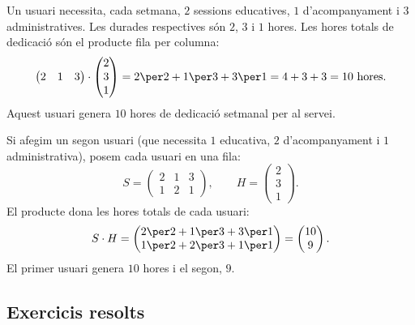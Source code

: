 \begin{exemple}
Un usuari necessita, cada setmana, $2$ sessions educatives, $1$ d'acompanyament i
$3$ administratives. Les durades respectives són $2$, $3$ i $1$ hores. Les hores
totals de dedicació són el producte fila per columna:
\[
\begin{pmatrix} 2 & 1 & 3 \end{pmatrix}\cdot\begin{pmatrix} 2 \\ 3 \\ 1 \end{pmatrix}
= 2\per 2 + 1\per 3 + 3\per 1 = 4 + 3 + 3 = 10 \text{ hores}.
\]
Aquest usuari genera $10$ hores de dedicació setmanal per al servei.
\end{exemple}

\begin{exemple}
Si afegim un segon usuari (que necessita $1$ educativa, $2$ d'acompanyament i $1$
administrativa), posem cada usuari en una fila:
\[
S=\begin{pmatrix} 2 & 1 & 3 \\ 1 & 2 & 1 \end{pmatrix},\qquad
H=\begin{pmatrix} 2 \\ 3 \\ 1 \end{pmatrix}.
\]
El producte dona les hores totals de cada usuari:
\[
S\cdot H=\begin{pmatrix} 2\per 2+1\per 3+3\per 1 \\ 1\per 2+2\per 3+1\per 1 \end{pmatrix}
        =\begin{pmatrix} 10 \\ 9 \end{pmatrix}.
\]
El primer usuari genera $10$ hores i el segon, $9$.
\end{exemple}

\subsection{Exercicis resolts}

